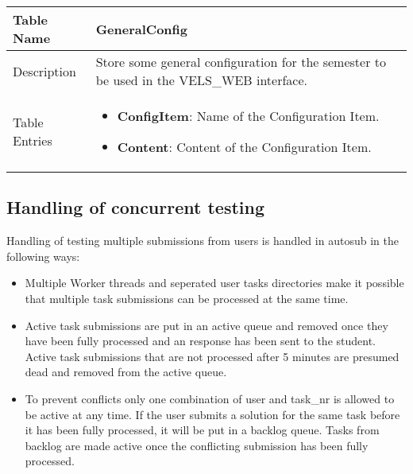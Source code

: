 \begin{tabular}{|p{3cm}|p{10cm}|}
\hline
Table Name & GeneralConfig \\
\hline
Description & Store some general configuration for the semester to be used in the
VELS\_WEB interface. \\
\hline
Table Entries & \begin{itemize}
    \item {\bf ConfigItem}: Name of the Configuration Item.
    \item {\bf Content}: Content of the Configuration Item.
    \end{itemize} \\
\hline
\end{tabular}

\subsection{Handling of concurrent testing}
Handling of testing multiple submissions from users is handled in autosub in the following ways:
\begin{itemize}
\item Multiple Worker threads and seperated user tasks directories make it possible that
	multiple task submissions can be processed at the same time.
\item Active task submissions are put in an active queue and removed once they have been fully
	processed and an response has been sent to the student. Active task submissions that are 
	not processed after 5 minutes are presumed dead and removed from the active queue.
\item To prevent conflicts only one combination of user and task\_nr is allowed to be active at any
	time. If the user submits a solution for the same task before it has been fully processed, it 
	will be put in a backlog queue. Tasks from backlog are made active once the conflicting 
	submission has been fully processed.
\end{itemize}
